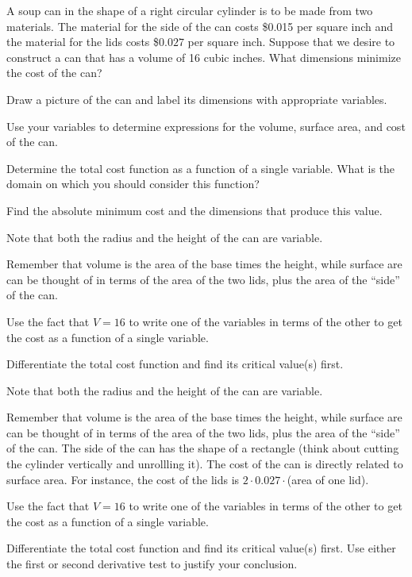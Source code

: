 \begin{activity} \label{A:3.4.1} A soup can in the shape of a right circular cylinder is to be made from two materials.  The material for the side of the can costs \$0.015 per square inch and the material for the lids costs \$$0.027$ per square inch.  Suppose that we desire to construct a can that has a volume of 16 cubic inches.  What dimensions minimize the cost of the can?
\ba
	\item Draw a picture of the can and label its dimensions with appropriate variables.
	\item Use your variables to determine expressions for the volume, surface area, and cost of the can.
	\item Determine the total cost function as a function of a single variable.  What is the domain on which you should consider this function?
	\item Find the absolute minimum cost and the dimensions that produce this value.
\ea
\end{activity}
\begin{smallhint}
\ba
	\item Note that both the radius and the height of the can are variable.
	\item Remember that volume is the area of the base times the height, while surface are can be thought of in terms of the area of the two lids, plus the area of the ``side'' of the can.
	\item Use the fact that $V = 16$ to write one of the variables in terms of the other to get the cost as a function of a single variable.
	\item Differentiate the total cost function and find its critical value(s) first.
\ea
\end{smallhint}
\begin{bighint}
\ba
	\item Note that both the radius and the height of the can are variable.
	\item Remember that volume is the area of the base times the height, while surface are can be thought of in terms of the area of the two lids, plus the area of the ``side'' of the can.  The side of the can has the shape of a rectangle (think about cutting the cylinder vertically and unrollling it).  The cost of the can is directly related to surface area.  For instance, the cost of the lids is $2 \cdot 0.027 \cdot$(area of one lid).
	\item Use the fact that $V = 16$ to write one of the variables in terms of the other to get the cost as a function of a single variable.
	\item Differentiate the total cost function and find its critical value(s) first.  Use either the first or second derivative test to justify your conclusion.
\ea
\end{bighint}
